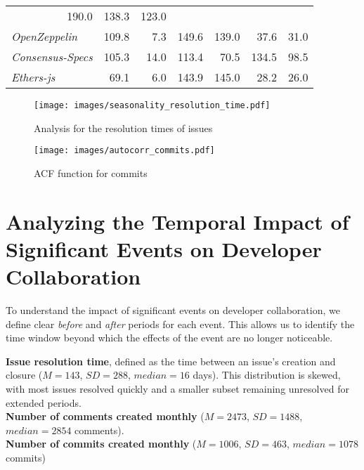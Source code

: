\begin{table}[h!]
{\begin{tabular}{c cc cc cc }
  \multicolumn{1}{r}{190.0} &
  \multicolumn{1}{r}{138.3} &
  \multicolumn{1}{r}{123.0} \\ 
\multicolumn{1}{l}{\textit{OpenZeppelin}} &
  \multicolumn{1}{r}{109.8} &
  \multicolumn{1}{r}{7.3} &
  \multicolumn{1}{r}{149.6} &
  \multicolumn{1}{r}{139.0} &
  \multicolumn{1}{r}{37.6} &
  \multicolumn{1}{r}{31.0} \\ 
\multicolumn{1}{l}{\textit{Consensus-Specs}}  & \multicolumn{1}{r}{105.3} & \multicolumn{1}{r}{14.0} & \multicolumn{1}{r}{113.4}  & \multicolumn{1}{r}{70.5}   & \multicolumn{1}{r}{134.5}  & \multicolumn{1}{r}{98.5}   \\ 
\multicolumn{1}{l}{\textit{Ethers-js}} &
  \multicolumn{1}{r}{69.1} &
  \multicolumn{1}{r}{6.0} &
  \multicolumn{1}{r}{143.9} &
  \multicolumn{1}{r}{145.0} &
  \multicolumn{1}{r}{28.2} &
  \multicolumn{1}{r}{26.0} \\ 
 \hline
\end{tabular}%
}
\label{tab:metriche}
\end{table}

\begin{figure}[t!]   
    \centering \texttt{[image: images/seasonality\_resolution\_time.pdf]}
    \caption{Analysis for the resolution times of issues}
    \label{fig: season resol time}
\end{figure}

\begin{figure}[t!]
\centering
    \centering \texttt{[image: images/autocorr\_commits.pdf]} 
    \caption{ACF function for commits} \label{fig: ACF commits}
\end{figure}


\section{Analyzing the Temporal Impact of Significant Events on Developer Collaboration}\label{RQ1}

To understand the impact of significant events on developer collaboration, we define clear \textit{before} and \textit{after} periods for each event. This allows us to identify the time window beyond which the effects of the event are no longer noticeable. 


\textbf{Issue resolution time}, defined as the time between an issue's creation and closure \cite{ortu2015bullies} ($M = 143$, $SD = 288$, $median = 16$ days). This distribution is skewed, with most issues resolved quickly and a smaller subset remaining unresolved for extended periods.\\
\textbf{Number of comments created monthly} ($M = 2473$, $SD = 1488$, $median = 2854$ comments).\\
\textbf{Number of commits created monthly} ($M = 1006$, $SD = 463$, $median = 1078$ commits)

